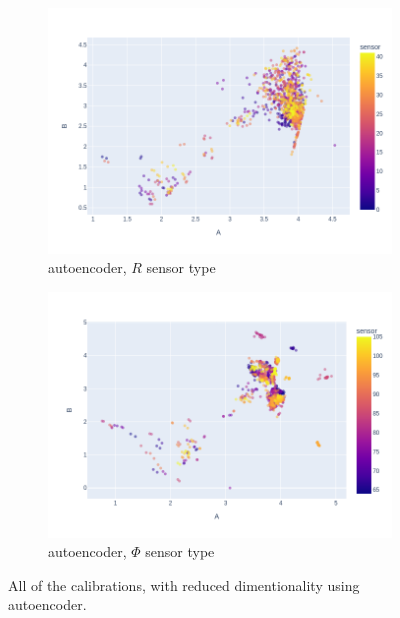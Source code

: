 \begin{figure}
\centering
\begin{subfigure}[b]{0.9\textwidth}
    \centering
    \includegraphics[width=\linewidth]{figures/chapter4/dimred/NN_module_R_all.png}
\caption{autoencoder, $R$ sensor type}
   \label{plot:nn_all_r}
  \end{subfigure}
\begin{subfigure}[b]{0.9\textwidth}
    \centering
    \includegraphics[width=\linewidth]{figures/chapter4/dimred/NN_module_phi_all.png}
\caption{autoencoder, $\Phi$ sensor type}
   \label{plot:nn_all_phi}
  \end{subfigure}

    \caption[All calibrationd]{All of the calibrations, with reduced dimentionality using autoencoder.}
\end{figure}

